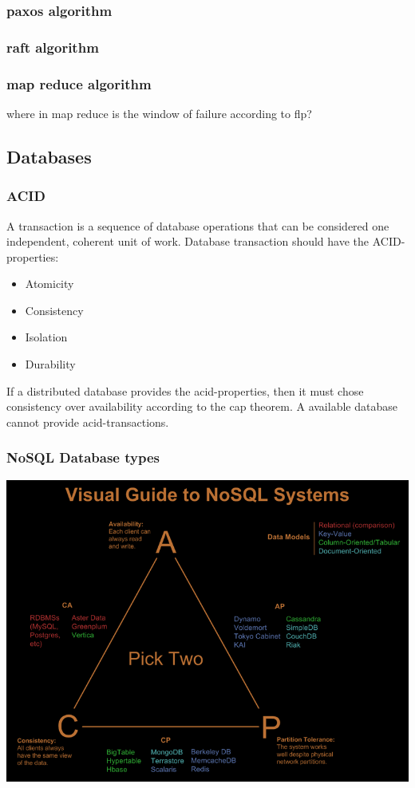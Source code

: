 \subsubsection{paxos algorithm}

\subsubsection{raft algorithm}

\subsubsection{map reduce algorithm}
where in map reduce is the window of failure according to flp?


\subsection{Databases}

\subsubsection{ACID}
A transaction is a sequence of database operations that can be considered one independent, coherent unit of work. Database transaction should have the ACID-properties:
\begin{itemize}
    \item Atomicity
    \item Consistency
    \item Isolation
    \item Durability
\end{itemize}

If a distributed database provides the acid-properties, then it must chose consistency over availability according to the cap theorem. A available database cannot provide acid-transactions. 

\subsubsection{NoSQL Database types}
\includegraphics[scale=0.5]{images/cap_choice.png}


